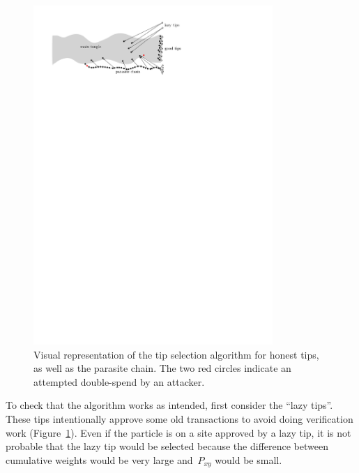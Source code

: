 \documentclass[12pt]{article}
\begin{document}
\begin{CJK}{UTF8}{bkai}
\begin{figure}
 \centering \includegraphics[width=0.81\textwidth]{tip_Markov} 
\caption{Visual representation of the tip selection algorithm for 
honest tips, as well as the parasite chain. The two red circles 
indicate an attempted double-spend by an attacker.
}
\label{f_tip_Markov}
\end{figure}

To check that the algorithm works as intended, first consider the ``lazy
tips''. These tips intentionally approve some old transactions
to avoid doing verification work (Figure~\ref{f_tip_Markov}).
Even if the particle 
is on a site approved by a lazy tip, it is not probable that the lazy
tip would be selected because the difference between cumulative
 weights would be very large and~$P_{xy}$ would be small.


\end{CJK}
\end{document}
